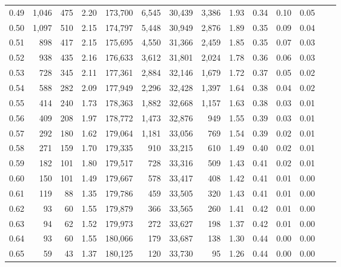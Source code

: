 \begin{tabular}{rrrrrrrrrrrrrr}
0.49 &  1,046 &    475 &    2.20 &  173,700 &    6,545 &  30,439 &   3,386 &  1.93 &  0.34 &  0.10 &      0.05 \\
0.50 &  1,097 &    510 &    2.15 &  174,797 &    5,448 &  30,949 &   2,876 &  1.89 &  0.35 &  0.09 &      0.04 \\
0.51 &    898 &    417 &    2.15 &  175,695 &    4,550 &  31,366 &   2,459 &  1.85 &  0.35 &  0.07 &      0.03 \\
0.52 &    938 &    435 &    2.16 &  176,633 &    3,612 &  31,801 &   2,024 &  1.78 &  0.36 &  0.06 &      0.03 \\
0.53 &    728 &    345 &    2.11 &  177,361 &    2,884 &  32,146 &   1,679 &  1.72 &  0.37 &  0.05 &      0.02 \\
0.54 &    588 &    282 &    2.09 &  177,949 &    2,296 &  32,428 &   1,397 &  1.64 &  0.38 &  0.04 &      0.02 \\
0.55 &    414 &    240 &    1.73 &  178,363 &    1,882 &  32,668 &   1,157 &  1.63 &  0.38 &  0.03 &      0.01 \\
0.56 &    409 &    208 &    1.97 &  178,772 &    1,473 &  32,876 &     949 &  1.55 &  0.39 &  0.03 &      0.01 \\
0.57 &    292 &    180 &    1.62 &  179,064 &    1,181 &  33,056 &     769 &  1.54 &  0.39 &  0.02 &      0.01 \\
0.58 &    271 &    159 &    1.70 &  179,335 &      910 &  33,215 &     610 &  1.49 &  0.40 &  0.02 &      0.01 \\
0.59 &    182 &    101 &    1.80 &  179,517 &      728 &  33,316 &     509 &  1.43 &  0.41 &  0.02 &      0.01 \\
0.60 &    150 &    101 &    1.49 &  179,667 &      578 &  33,417 &     408 &  1.42 &  0.41 &  0.01 &      0.00 \\
0.61 &    119 &     88 &    1.35 &  179,786 &      459 &  33,505 &     320 &  1.43 &  0.41 &  0.01 &      0.00 \\
0.62 &     93 &     60 &    1.55 &  179,879 &      366 &  33,565 &     260 &  1.41 &  0.42 &  0.01 &      0.00 \\
0.63 &     94 &     62 &    1.52 &  179,973 &      272 &  33,627 &     198 &  1.37 &  0.42 &  0.01 &      0.00 \\
0.64 &     93 &     60 &    1.55 &  180,066 &      179 &  33,687 &     138 &  1.30 &  0.44 &  0.00 &      0.00 \\
0.65 &     59 &     43 &    1.37 &  180,125 &      120 &  33,730 &      95 &  1.26 &  0.44 &  0.00 &      0.00 \\

\end{tabular}
